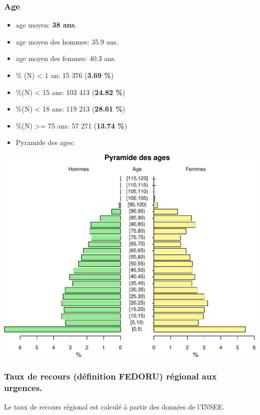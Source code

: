 \documentclass[]{article}
\begin{document}
\subsubsection{Age}\label{age}

\begin{itemize}
\item
  age moyen: \textbf{38 ans}.
\item
  age moyen des hommes: 35.9 ans.
\item
  age moyen des femmes: 40.3 ans.
\item
  \% (N) \textless{} 1 an: 15 376 (\textbf{3.69 \%})
\item
  \%(N) \textless{} 15 ans: 103 413 (\textbf{24.82 \%})
\item
  \%(N) \textless{} 18 ans: 119 213 (\textbf{28.61 \%})
\item
  \%(N) \textgreater{}= 75 ans: 57 271 (\textbf{13.74 \%})
\item
  Pyramide des ages:
\end{itemize}

\includegraphics{rapport2014_V4_files/figure-latex/pyramide-1.pdf}

\subsubsection{Taux de recours (définition FEDORU) régional aux
urgences.}\label{taux-de-recours-definition-fedoru-regional-aux-urgences.}

Le taux de recours régional est calculé à partir des données de l'INSEE.
\end{document}
